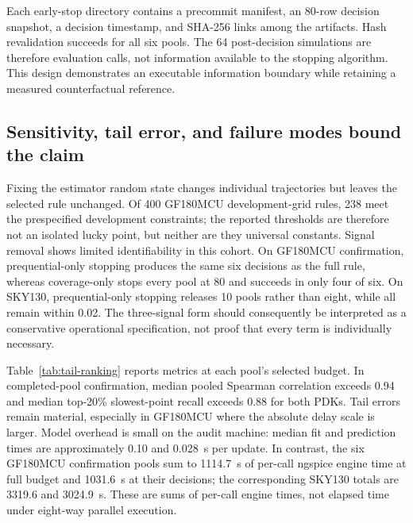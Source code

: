 \documentclass[preprint,12pt]{elsarticle}
\begin{document}
\begin{table}[H]
\centering
\caption{Prospective seed-5 confirmation. Calls avoided are relative to an operational 96-call pool; the study subsequently executes them only to measure the reference gap.}
\label{tab:prospective}
\end{table}

Each early-stop directory contains a precommit manifest, an 80-row decision snapshot, a decision timestamp, and SHA-256 links among the artifacts. Hash revalidation succeeds for all six pools. The 64 post-decision simulations are therefore evaluation calls, not information available to the stopping algorithm. This design demonstrates an executable information boundary while retaining a measured counterfactual reference.

\subsection{Sensitivity, tail error, and failure modes bound the claim}

Fixing the estimator random state changes individual trajectories but leaves the selected rule unchanged. Of 400 GF180MCU development-grid rules, 238 meet the prespecified development constraints; the reported thresholds are therefore not an isolated lucky point, but neither are they universal constants. Signal removal shows limited identifiability in this cohort. On GF180MCU confirmation, prequential-only stopping produces the same six decisions as the full rule, whereas coverage-only stops every pool at 80 and succeeds in only four of six. On SKY130, prequential-only stopping releases 10 pools rather than eight, while all remain within 0.02. The three-signal form should consequently be interpreted as a conservative operational specification, not proof that every term is individually necessary.

Table~\ref{tab:tail-ranking} reports metrics at each pool's selected budget. In completed-pool confirmation, median pooled Spearman correlation exceeds 0.94 and median top-20\% slowest-point recall exceeds 0.88 for both PDKs. Tail errors remain material, especially in GF180MCU where the absolute delay scale is larger. Model overhead is small on the audit machine: median fit and prediction times are approximately 0.10 and 0.028~s per update. In contrast, the six GF180MCU confirmation pools sum to 1114.7~s of per-call ngspice engine time at full budget and 1031.6~s at their decisions; the corresponding SKY130 totals are 3319.6 and 3024.9~s. These are sums of per-call engine times, not elapsed time under eight-way parallel execution.
\end{document}
